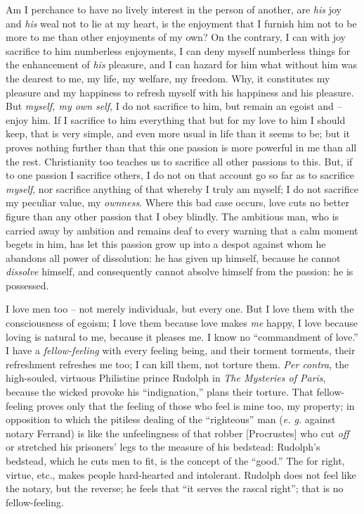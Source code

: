 \documentclass[12pt,a4paper]{book}
\begin{document}
Am I perchance to have no lively interest in the person of another, are 
\textit{his} joy and \textit{his} weal not to lie at my heart, is the 
enjoyment that I furnish him not to be more to me than other enjoyments of my 
own? On the contrary, I can with joy sacrifice to him numberless enjoyments, I 
can deny myself numberless things for the enhancement of \textit{his} 
pleasure, and I can hazard for him what without him was the dearest to me, my 
life, my welfare, my freedom. Why, it constitutes my pleasure and my happiness 
to refresh myself with his happiness and his pleasure. But \textit{myself, my 
own self}, I do not sacrifice to him, but remain an egoist and -- enjoy him. 
If I sacrifice to him everything that but for my love to him I should keep, 
that is very simple, and even more usual in life than it seems to be; but it 
proves nothing further than that this one passion is more powerful in me than 
all the rest. Christianity too teaches us to sacrifice all other passions to 
this. But, if to one passion I sacrifice others, I do not on that account go 
so far as to sacrifice \textit{myself}, nor sacrifice anything of that whereby 
I truly am myself; I do not sacrifice my peculiar value, my \textit{ownness}. 
Where this bad case occurs, love cuts no better figure than any other passion 
that I obey blindly. The ambitious man, who is carried away by ambition and 
remains deaf to every warning that a calm moment begets in him, has let this 
passion grow up into a despot against whom he abandons all power of 
dissolution: he has given up himself, because he cannot \textit{dissolve} 
himself, and consequently cannot absolve himself from the passion: he is 
possessed.

I love men too -- not merely individuals, but every one. But I love them with 
the consciousness of egoism; I love them because love makes \textit{me} happy, 
I love because loving is natural to me, because it pleases me. I know no 
``commandment of love.'' I have a \textit{fellow-feeling} with every feeling 
being, and their torment torments, their refreshment refreshes me too; I can 
kill them, not torture them. \textit{Per contra}, the high-souled, virtuous 
Philistine prince Rudolph in \textit{The Mysteries of Paris}, because the 
wicked provoke his ``indignation,'' plans their torture. That fellow-feeling 
proves only that the feeling of those who feel is mine too, my property; in 
opposition to which the pitiless dealing of the ``righteous'' man 
(\textit{e. g.} against notary Ferrand) is like the unfeelingness of that 
robber [Procrustes] who cut \textit{off} or stretched his prisoners' legs to 
the measure of his bedstead: Rudolph's bedstead, which he cuts men to fit, is 
the concept of the ``good.'' The for right, virtue, etc., makes people 
hard-hearted and intolerant. Rudolph does not feel like the notary, but the 
reverse; he feels that ``it serves the rascal right''; that is no 
fellow-feeling.
\end{document}
